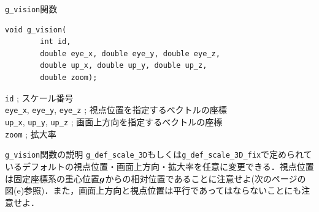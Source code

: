 \documentclass[platex,a4paper,12pt]{jsarticle}%
\def\Vec#1{\mbox{\boldmath $#1$}}
\begin{document}
\begin{itembox}[l]{\texttt{g\_vision}関数}
\begin{verbatim}
void g_vision(
        int id,
        double eye_x, double eye_y, double eye_z,
        double up_x, double up_y, double up_z, 
        double zoom);
\end{verbatim}
\verb|id| ; スケール番号 \\
\verb|eye_x|, \verb|eye_y|, \verb|eye_z| ; 視点位置を指定するべクトルの座標 \\
\verb|up_x|, \verb|up_y|, \verb|up_z| ; 画面上方向を指定するべクトルの座標 \\
\verb|zoom| ; 拡大率 
\end{itembox}

\begin{itembox}[l]{\texttt{g\_vision}関数の説明}
\verb|g_def_scale_3D|もしくは\verb|g_def_scale_3D_fix|で定められているデフォルトの視点位置・画面上方向・拡大率を任意に変更できる．視点位置は固定座標系の重心位置$\Vec{g}$からの相対位置であることに注意せよ(次のページの図(e)参照)．また，画面上方向と視点位置は平行であってはならないことにも注意せよ．
\end{itembox}
\end{document}
